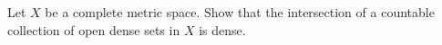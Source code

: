 Let $X$ be a complete metric space. Show that the intersection of a
countable collection of open dense sets in $X$ is dense.

